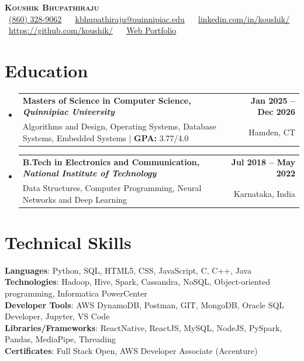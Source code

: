 \documentclass[letterpaper,11pt]{article}
\makeatletter
\newcommand{\resumeSubheading}[4]{
  \vspace{-2pt}\item
    \begin{tabular*}{1.0\textwidth}[t]{l@{\extracolsep{\fill}}r}
      \textbf{#1} & \textbf{\small #2} \\
      {\small#3} & {\small #4} \\
    \end{tabular*}\vspace{-7pt}
}
\newcommand{\resumeSubHeadingListStart}{\begin{itemize}[leftmargin=0.0in, label={}]}
\newcommand{\resumeSubHeadingListEnd}{\end{itemize}}\vspace{0pt}
\makeatother
\begin{document}
\begin{center}
    {\Large \scshape \textbf{Koushik Bhupathiraju}} \\[2mm]
    \footnotesize \raisebox{-0.1\height}
    \faPhone\ \underline{(860) 328-9062} ~ 
    {\faEnvelope\  \underline{kbhupathiraju@quinnipiac.edu}} ~ 
    {\faLinkedin\ \underline{\href{https://www.linkedin.com/in/koushik-bhupathiraju-b26649188/}{linkedin.com/in/koushik/}}}  ~
     {\faGithub\ \underline{\href{https://github.com/koushikvarmaJS}{https://github.com/koushik/}}} ~
    {\faBriefcase\ \underline{\href{https://koushikvarmajs.github.io/portfolio/}{Web Portfolio}}}
    \vspace{-8pt}
\end{center}

\section{Education}
\resumeSubHeadingListStart
  \resumeSubheading
    {Masters of Science in Computer Science, \textmd{\textit{Quinnipiac University}}}{Jan 2025 -- Dec 2026}
    {Algorithms and Design, Operating Systems, Database Systems, Embedded Systems $|$ \textbf{GPA: }3.77/4.0}{Hamden, CT}

  \resumeSubheading
    {B.Tech in Electronics and Communication, \textmd{\textit{National Institute of Technology}}}{Jul 2018 -- May 2022}
    {Data Structures, Computer Programming, Neural Networks and Deep Learning}{Karnataka, India}
\resumeSubHeadingListEnd
    
    \vspace{-14pt}
\section{Technical Skills}
 \begin{itemize}[leftmargin=0.15in, label={}]
    \small{\item{   
     \textbf{Languages}{: Python, SQL, HTML5, CSS, JavaScript, C, C++, Java} \\[1mm]
      \textbf{Technologies}{: Hadoop, Hive, Spark, Cassandra, NoSQL, Object-oriented programming, Informatica PowerCenter } \\[1mm]
     \textbf{Developer Tools}{: AWS DynamoDB, Postman, GIT, MongoDB, Oracle SQL Developer, Jupyter, VS Code} \\[1mm]
     \textbf{Libraries/Frameworks}{:  ReactNative, ReactJS, MySQL, NodeJS, PySpark, Pandas, MediaPipe, Threading} \\ [1mm]
     \textbf{Certificates}{:  Full Stack Open, AWS Developer Associate (Accenture)} \\ [1mm]
    }}
 \end{itemize}
 \vspace{-14pt}
\end{document}
